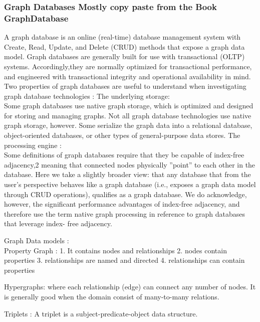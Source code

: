 \documentclass[english]{tktltiki}
\begin{document}
\subsubsection{Graph Databases Mostly copy paste from the Book GraphDatabase}
A graph database is an online (real-time) database management system with Create, Read, Update, and Delete (CRUD) methods that expose a graph data model. Graph databases are generally built for use with transactional (OLTP) systems. Accordingly,they are normally optimized for transactional performance, and engineered with transactional integrity and operational availability in mind.
Two properties of graph databases are useful to understand when investigating graph database technologies :
The underlying storage: \\
Some graph databases use native graph storage, which is optimized and designed for storing and managing graphs. Not all graph database technologies use native graph storage, however. Some serialize the graph data into a relational database, object-oriented databases, or other types of general-purpose data stores.
The processing engine :\\
Some definitions of graph databases require that they be capable of index-free adjacency,2 meaning that connected nodes physically ''point'' to each other in the database. Here we take a slightly broader view: that any database that from the user's perspective behaves like a graph database (i.e., exposes a graph data model through CRUD operations), qualifies as a graph database. We do acknowledge, however, the significant performance advantages of index-free adjacency, and therefore use the term native graph processing in reference to graph databases that leverage index- free adjacency.

Graph Data models : \\
Property Graph : 
1. It contains nodes and relationships
2. nodes contain properties
3. relationships are named and directed
4. relationships can contain properties

Hypergraphs:
where each relationship (edge) can connect any number of nodes. It is generally good when the domain consist of many-to-many relations.

Triplets : 
A triplet is a subject-predicate-object data structure. 
\end{document}
